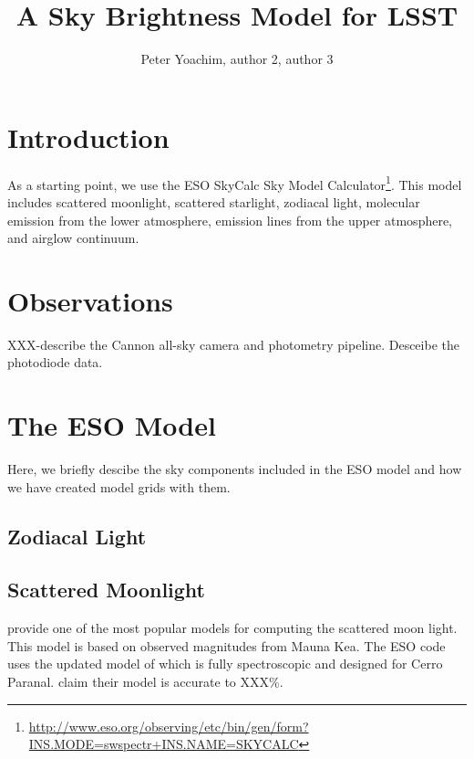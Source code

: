 \documentclass{emulateapj}  %
\begin{document}
\title{A Sky Brightness Model for LSST}


\author{Peter Yoachim, author 2, author 3}


\begin{abstract}

\end{abstract}


\section{Introduction}

As a starting point, we use the ESO SkyCalc Sky Model Calculator\footnote{\url{http://www.eso.org/observing/etc/bin/gen/form?INS.MODE=swspectr+INS.NAME=SKYCALC}}.  This model includes scattered moonlight, scattered starlight, zodiacal light, molecular emission from the lower atmosphere, emission lines from the upper atmosphere, and airglow continuum.  

\section{Observations}

XXX-describe the Cannon all-sky camera and photometry pipeline. Desceibe the photodiode data.  


\section{The ESO Model}
Here, we briefly descibe the sky components included in the ESO model and how we have created model grids with them.
\subsection{Zodiacal Light}


\subsection{Scattered Moonlight}

\citet{Krisciunas91} provide one of the most popular models for computing the scattered moon light. This model is based on observed magnitudes from Mauna Kea. The ESO code uses the updated model of \citet{Jones13} which is fully spectroscopic and designed for Cerro Paranal. \citet{Jones13} claim their model is accurate to XXX\%.  
\end{document}
